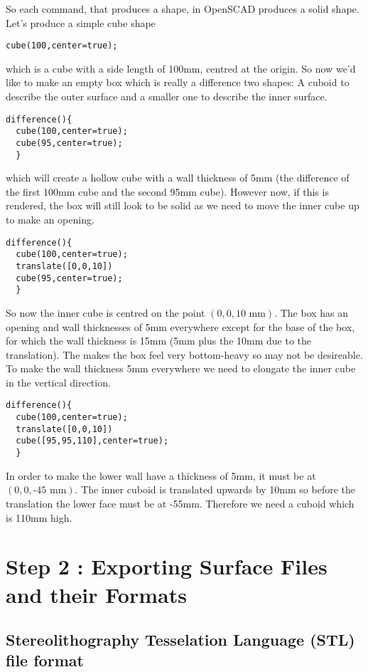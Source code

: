 So each command, that produces a shape, in OpenSCAD produces a solid shape. Let's produce a simple cube shape
\begin{lstlisting}
cube(100,center=true);
\end{lstlisting}
which is a cube with a side length of 100mm, centred at the origin. So now we'd like to make an empty box which is really a difference two shapes: A cuboid to describe the outer surface and a smaller one to describe the inner surface. 
\begin{lstlisting}
difference(){
  cube(100,center=true);
  cube(95,center=true);
  }
\end{lstlisting}
which will create a hollow cube with a wall thickness of 5mm (the difference of the first 100mm cube and the second 95mm cube). However now, if this is rendered, the box will still look to be solid as we need to move the inner cube up to make an opening. 
\begin{lstlisting}
difference(){
  cube(100,center=true);
  translate([0,0,10])
  cube(95,center=true);
  }
\end{lstlisting}
So now the inner cube is centred on the point $\left(0,0,\textrm{10~mm}\right)$. The box has an opening and wall thicknesses of 5mm everywhere except for the base of the box, for which the wall thickness is 15mm (5mm plus the 10mm due to the translation). The makes the box feel very bottom-heavy so may not be desireable. To make the wall thickness 5mm everywhere we need to elongate the inner cube in the vertical direction. 
\begin{lstlisting}
difference(){
  cube(100,center=true);
  translate([0,0,10])
  cube([95,95,110],center=true);
  }
\end{lstlisting}
In order to make the lower wall have a thickness of 5mm, it must be at $\left(0,0,\textrm{-45~mm}\right)$. The inner cuboid is translated upwards by 10mm so before the translation the lower face must be at -55mm. Therefore we need a cuboid which is 110mm high. 







\newpage
\section{Step 2 : Exporting Surface Files and their Formats}

\subsection{Stereolithography Tesselation Language (STL) file format}

